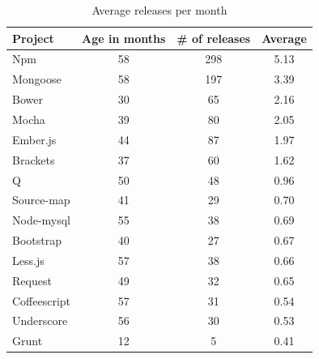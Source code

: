\begin{table}[!hbt]
    \begin{center}
        \caption{Average releases per month}
        \label{tab:average_release}
        \begin{tabular}{l| c c c}
           \toprule
           \textbf{Project} & \textbf{Age in months} & \textbf{\# of releases} & \textbf{Average}\\ \midrule
           Npm          &    58 &  298 &   5.13 \\ 
           Mongoose     &    58 &  197 &   3.39 \\
           Bower        &    30 &   65 &   2.16 \\
           Mocha        &    39 &   80 &   2.05 \\
           Ember.js     &    44 &   87 &   1.97 \\
           Brackets     &    37 &   60 &   1.62 \\
           Q            &    50 &   48 &   0.96 \\
           Source-map   &    41 &   29 &   0.70 \\
           Node-mysql   &    55 &   38 &   0.69 \\
           Bootstrap    &    40 &   27 &   0.67 \\
           Less.js      &    57 &   38 &  0.66 \\
           Request      &    49 &   32 &  0.65 \\
           Coffeescript &    57 &   31 &  0.54 \\
           Underscore   &    56 &   30 &  0.53 \\
           Grunt        &    12 &    5 &  0.41 \\ \bottomrule
      \end{tabular}
    \end{center}
\end{table}




